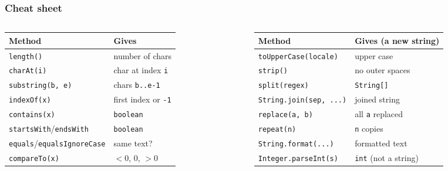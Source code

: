 \documentclass[aspectratio=169,10pt,compress]{beamer}
\begin{document}
\begin{frame}[t,fragile] \frametitle{Cheat sheet}
  \footnotesize
  \begin{columns}[T]
    \begin{column}{0.48\textwidth}
      \begin{tabular}{@{}L{0.5\textwidth}L{0.42\textwidth}@{}}
        \toprule
        \textbf{Method} & \textbf{Gives} \\
        \midrule
        \texttt{length()}                 & number of chars \\
        \texttt{charAt(i)}                & char at index \texttt{i} \\
        \texttt{substring(b, e)}          & chars \texttt{b..e-1} \\
        \texttt{indexOf(x)}               & first index or \texttt{-1} \\
        \texttt{contains(x)}              & \texttt{boolean} \\
        \texttt{startsWith}/\texttt{endsWith} & \texttt{boolean} \\
        \texttt{equals}/\texttt{equalsIgnoreCase} & same text? \\
        \texttt{compareTo(x)}             & $<0$, $0$, $>0$ \\
        \bottomrule
      \end{tabular}
    \end{column}
    \begin{column}{0.48\textwidth}
      \begin{tabular}{@{}L{0.5\textwidth}L{0.42\textwidth}@{}}
        \toprule
        \textbf{Method} & \textbf{Gives (a new string)} \\
        \midrule
        \texttt{toUpperCase(locale)}      & upper case \\
        \texttt{strip()}                  & no outer spaces \\
        \texttt{split(regex)}             & \texttt{String[]} \\
        \texttt{String.join(sep, ...)}    & joined string \\
        \texttt{replace(a, b)}            & all \texttt{a} replaced \\
        \texttt{repeat(n)}                & \texttt{n} copies \\
        \texttt{String.format(...)}       & formatted text \\
        \texttt{Integer.parseInt(s)}      & \texttt{int} (not a string) \\
        \bottomrule
      \end{tabular}
    \end{column}
  \end{columns}
\end{frame}
\end{document}
